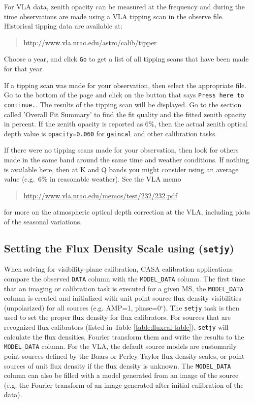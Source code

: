 For VLA data, zenith opacity can be measured at the frequency
and during the time observations are made using a VLA tipping scan in
the observe file.  Historical tipping data are available at:
\begin{quote}
   \url{http://www.vla.nrao.edu/astro/calib/tipper}
\end{quote}
Choose a year, and click {\tt Go} to get a list of all tipping scans
that have been made for that year.

If a tipping scan was made for your observation, then select the
appropriate file.  Go to the bottom of the page and click on the
button that says {\tt Press here to continue.}.  The results of the
tipping scan will be displayed.  Go to the section called 'Overall Fit
Summary' to find the fit quality and the fitted zenith opacity in
percent.  If the zenith opacity is reported as 6\%, then the actual
zenith optical depth value is {\tt opacity=0.060} for {\tt gaincal}
and other calibration tasks.

If there were no tipping scans made for your observation, then look
for others made in the same band around the same time and weather
conditions.  If nothing is available here, then at K and Q bands
you might consider using an average value (e.g.\ 6\% in reasonable
weather).  See the VLA memo
\begin{quote}
   \url{http://www.vla.nrao.edu/memos/test/232/232.pdf}
\end{quote}
for more on the atmospheric optical depth correction at the VLA,
including plots of the seasonal variations.

\subsection{Setting the Flux Density Scale using ({\tt setjy})}
\label{section:cal.prior.models}

When solving for visibility-plane calibration, CASA calibration applications
compare the observed {\tt DATA} column with the {\tt MODEL\_DATA} column.
The first time that an imaging or calibration task is executed for a
given MS, the {\tt MODEL\_DATA} column is created and initialized with unit
point source flux density visibilities (unpolarized) for all sources
(e.g. AMP=1, phase=0$^{\circ}$).  The {\tt setjy} task is
then used to set the proper flux density for flux calibrators.  For
sources that are recognized flux calibrators (listed in Table
\ref{table:fluxcal-table}), {\tt setjy} will calculate the flux
densities, Fourier transform them and write the results to the
{\tt MODEL\_DATA} column.  For the VLA, the default source models are
customarily point sources defined by the Baars or Perley-Taylor flux
density scales, or point sources of unit flux density if the flux
density is unknown.  The {\tt MODEL\_DATA} column can also be filled with a
model generated from an image of the source (e.g. the Fourier
transform of an image generated after initial calibration of the
data).

